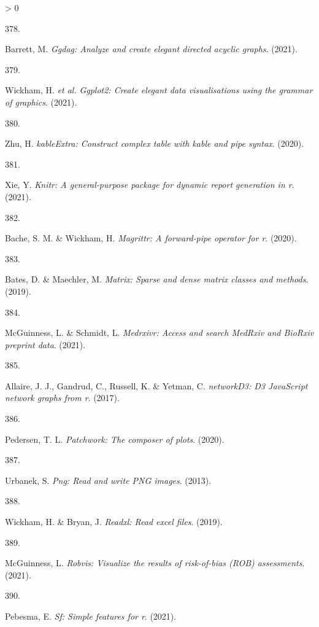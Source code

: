 \documentclass[a4paper, twoside]{templates/ociamthesis}
\newlength{\cslhangindent}
\newlength{\csllabelwidth}
\newenvironment{CSLReferences}[3] %
 {%
  \setlength{\parindent}{0pt}
  \ifodd #1 \everypar{\setlength{\hangindent}{\cslhangindent}}\ignorespaces\fi
  \ifnum #2 > 0
  \setlength{\parskip}{#2\baselineskip}
  \fi
 }%
 {}
\newcommand{\CSLLeftMargin}[1]{\parbox[t]{\maxof{\widthof{#1}}{\csllabelwidth}}{#1}}
\newcommand{\CSLRightInline}[1]{\parbox[t]{\linewidth - \csllabelwidth}{#1}}
\begin{document}
\begin{CSLReferences}{0}{0}
\leavevmode\hypertarget{ref-R-ggdag}{}%
\CSLLeftMargin{378. }
\CSLRightInline{Barrett, M. \emph{Ggdag: Analyze and create elegant directed acyclic graphs}. (2021).}

\leavevmode\hypertarget{ref-R-ggplot2}{}%
\CSLLeftMargin{379. }
\CSLRightInline{Wickham, H. \emph{et al.} \emph{Ggplot2: Create elegant data visualisations using the grammar of graphics}. (2021).}

\leavevmode\hypertarget{ref-R-kableExtra}{}%
\CSLLeftMargin{380. }
\CSLRightInline{Zhu, H. \emph{{kableExtra}: Construct complex table with kable and pipe syntax}. (2020).}

\leavevmode\hypertarget{ref-R-knitr}{}%
\CSLLeftMargin{381. }
\CSLRightInline{Xie, Y. \emph{Knitr: A general-purpose package for dynamic report generation in r}. (2021).}

\leavevmode\hypertarget{ref-R-magrittr}{}%
\CSLLeftMargin{382. }
\CSLRightInline{Bache, S. M. \& Wickham, H. \emph{Magrittr: A forward-pipe operator for r}. (2020).}

\leavevmode\hypertarget{ref-R-Matrix}{}%
\CSLLeftMargin{383. }
\CSLRightInline{Bates, D. \& Maechler, M. \emph{Matrix: Sparse and dense matrix classes and methods}. (2019).}

\leavevmode\hypertarget{ref-R-medrxivr}{}%
\CSLLeftMargin{384. }
\CSLRightInline{McGuinness, L. \& Schmidt, L. \emph{Medrxivr: Access and search {MedRxiv} and {BioRxiv} preprint data}. (2021).}

\leavevmode\hypertarget{ref-R-networkD3}{}%
\CSLLeftMargin{385. }
\CSLRightInline{Allaire, J. J., Gandrud, C., Russell, K. \& Yetman, C. \emph{{networkD3}: D3 {JavaScript} network graphs from r}. (2017).}

\leavevmode\hypertarget{ref-R-patchwork}{}%
\CSLLeftMargin{386. }
\CSLRightInline{Pedersen, T. L. \emph{Patchwork: The composer of plots}. (2020).}

\leavevmode\hypertarget{ref-R-png}{}%
\CSLLeftMargin{387. }
\CSLRightInline{Urbanek, S. \emph{Png: Read and write {PNG} images}. (2013).}

\leavevmode\hypertarget{ref-R-readxl}{}%
\CSLLeftMargin{388. }
\CSLRightInline{Wickham, H. \& Bryan, J. \emph{Readxl: Read excel files}. (2019).}

\leavevmode\hypertarget{ref-R-robvis}{}%
\CSLLeftMargin{389. }
\CSLRightInline{McGuinness, L. \emph{Robvis: Visualize the results of risk-of-bias ({ROB}) assessments}. (2021).}

\leavevmode\hypertarget{ref-R-sf}{}%
\CSLLeftMargin{390. }
\CSLRightInline{Pebesma, E. \emph{Sf: Simple features for r}. (2021).}


\end{CSLReferences}
\end{document}
